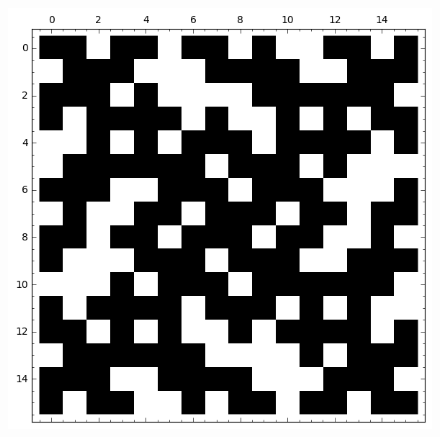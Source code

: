 \documentclass[pdf,sprung,slideColor,nocolorBG]{beamer}
\newenvironment{colortheme}[1]{
\def\ProvidesPackageRCS $##1${\relax}
\renewcommand{\ProcessOptions}{\relax}
\makeatletter

\makeatother
}{}
\begin{document}
\begin{colortheme}{jubata}
\begin{frame}
\begin{figure}
\begin{minipage}{.48\textwidth}
  \includegraphics[width=.9\linewidth]{../matrix_plot/tau_2_bent_cayley_graph_index_matrix.png}
  \label{fig:tau_2_bent_cayley_graph_index_matrix}
\end{minipage}
\end{figure}
\end{frame}


\end{colortheme}
\end{document}
